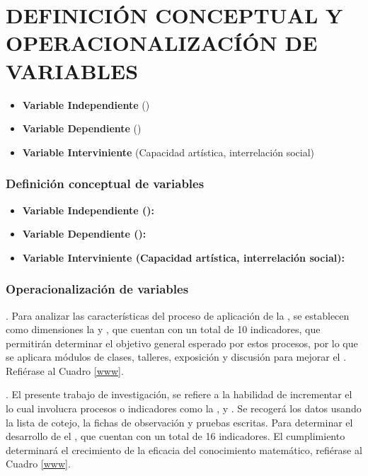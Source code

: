 \documentclass[12pt,a4paper]{article}
\begin{document}
\section{DEFINICIÓN CONCEPTUAL Y OPERACIONALIZACÍÓN DE VARIABLES }
\begin{itemize}
	\item \textbf{Variable Independiente} (\variablei)
	\item \textbf{Variable Dependiente} (\variabled)
	\item \textbf{Variable Interviniente} (Capacidad artística, interrelación social)
\end{itemize}

\subsubsection{Definición conceptual de variables}


\begin{itemize}
	\item \textbf{Variable Independiente (\variablei):}

	\item \textbf{Variable Dependiente (\variabled):}

	\item  \textbf{Variable Interviniente (Capacidad artística, interrelación social):}


\end{itemize}

\subsubsection{Operacionalización de variables}
\textbf{\variablei}. Para analizar las características del proceso de aplicación de la \MakeTextLowercase{\variablei}, se establecen como dimensiones la \emph{\MakeTextLowercase{\dimi}} y \emph{\MakeTextLowercase{\dimii}}, que cuentan con un total de 10 indicadores, que permitirán determinar el objetivo general esperado por estos procesos, por lo que se aplicara módulos de clases, talleres, exposición y discusión para mejorar el \MakeTextLowercase{\variabled}. Refiérase al Cuadro \ref{www}.

\textbf{\variabled}. El presente trabajo de investigación, se refiere a la habilidad
de incrementar el \MakeTextLowercase{\variabled} lo cual involucra procesos o indicadores como la \MakeTextLowercase{\dimd}, \MakeTextLowercase{\dimdd} y  \MakeTextLowercase{\dimddd}. Se recogerá los datos usando la lista de cotejo, la fichas de observación y pruebas escritas. Para determinar el desarrollo de el \MakeTextLowercase{\variabled}, que cuentan con un total de 16 indicadores.
El cumplimiento determinará el crecimiento de la  eficacia del conocimiento matemático, refiérase al Cuadro \ref{www}.
\end{document}

